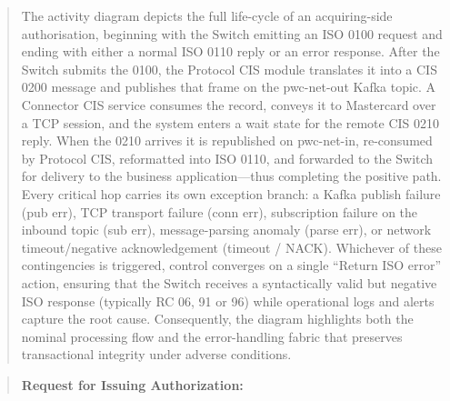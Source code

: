 \documentclass[12pt,a4paper]{report}
\begin{document}
\begin{quote}
The activity diagram depicts the full life-cycle of an acquiring-side authorisation, beginning with the Switch emitting an ISO 0100 request and ending with either a normal ISO 0110 reply or an error response. After the Switch submits the 0100, the Protocol CIS module translates it into a CIS 0200 message and publishes that frame on the pwc-net-out Kafka topic. A Connector CIS service consumes the record, conveys it to Mastercard over a TCP session, and the system enters a wait state for the remote CIS 0210 reply. When the 0210 arrives it is republished on pwc-net-in, re-consumed by Protocol CIS, reformatted into ISO 0110, and forwarded to the Switch for delivery to the business application—thus completing the positive path. Every critical hop carries its own exception branch: a Kafka publish failure (pub err), TCP transport failure (conn err), subscription failure on the inbound topic (sub err), message-parsing anomaly (parse err), or network timeout/negative acknowledgement (timeout / NACK). Whichever of these contingencies is triggered, control converges on a single “Return ISO error” action, ensuring that the Switch receives a syntactically valid but negative ISO response (typically RC 06, 91 or 96) while operational logs and alerts capture the root cause. Consequently, the diagram highlights both the nominal processing flow and the error-handling fabric that preserves transactional integrity under adverse conditions.
\end{quote}
\clearpage

\begin{quote}
\textbf{Request for Issuing Authorization:}
\end{quote}
\end{document}

